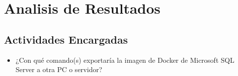 \section{Analisis  de Resultados} 


\subsection{Actividades Encargadas}
	\begin{itemize}
		\item ¿Con qué comando(s) exportaría la imagen de Docker de Microsoft SQL Server a otra PC o servidor?
		
	\end{itemize}



